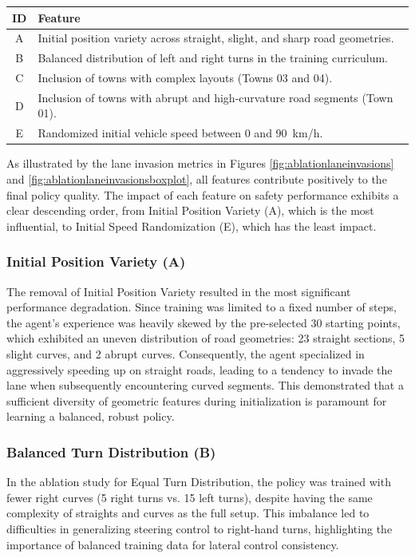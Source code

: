 \documentclass[]{interact}
\begin{document}
\begin{table}
{\begin{tabular}{|c|p{}|}
\hline
\textbf{ID} & \textbf{Feature} \\
\hline
A & Initial position variety across straight, slight, and sharp road geometries. \\
\hline
B & Balanced distribution of left and right turns in the training curriculum. \\
\hline
C & Inclusion of towns with complex layouts (Towns 03 and 04). \\
\hline
D & Inclusion of towns with abrupt and high-curvature road segments (Town 01). \\
\hline
E & Randomized initial vehicle speed between 0 and 90~km/h. \\
\hline
\end{tabular}}
\label{tab:ablationfeatures}
\end{table}

As illustrated by the lane invasion metrics in Figures \ref{fig:ablationlaneinvasions} and \ref{fig:ablationlaneinvasionsboxplot}, all features contribute positively to the final policy quality. The impact of each feature on safety performance exhibits a clear descending order, from Initial Position Variety (A), which is the most influential, to Initial Speed Randomization (E), which has the least impact.

\subsubsection{Initial Position Variety (A)}
The removal of Initial Position Variety resulted in the most significant performance degradation. Since training was limited to a fixed number of steps, the agent's experience was heavily skewed by the pre-selected 30 starting points, which exhibited an uneven distribution of road geometries: 23 straight sections, 5 slight curves, and 2 abrupt curves. Consequently, the agent specialized in aggressively speeding up on straight roads, leading to a tendency to invade the lane when subsequently encountering curved segments. This demonstrated that a sufficient diversity of geometric features during initialization is paramount for learning a balanced, robust policy.

\subsubsection{Balanced Turn Distribution (B)}
In the ablation study for Equal Turn Distribution, the policy was trained with fewer right curves (5 right turns vs. 15 left turns), despite having the same complexity of straights and curves as the full setup. This imbalance led to difficulties in generalizing steering control to right-hand turns, highlighting the importance of balanced training data for lateral control consistency.
\end{document}

